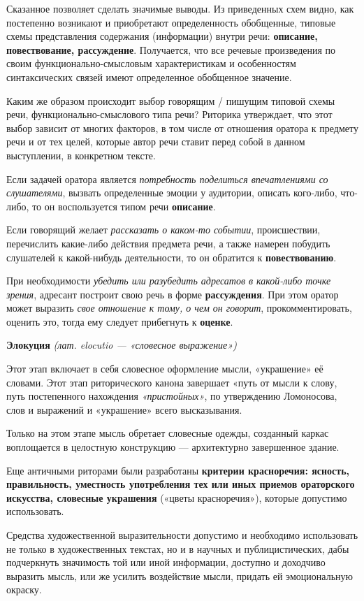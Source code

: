 Сказанное позволяет сделать значимые выводы. 
Из приведенных схем видно, как постепенно возникают и приобретают определенность обобщенные, типовые схемы представления содержания (информации) внутри речи: \textbf{описание, повествование, рассуждение}. Получается, что все речевые произведения по своим функционально-смысловым характеристикам и особенностям синтаксических связей имеют определенное обобщенное значение.

Каким же образом происходит выбор говорящим / пишущим типовой схемы речи, функционально-смыслового типа речи?  Риторика утверждает, что этот выбор зависит от многих факторов, в том числе от отношения оратора к предмету речи и от тех целей, которые автор речи ставит перед собой в данном выступлении, в конкретном тексте. 

Если задачей оратора является \textit{потребность поделиться впечатлениями со слушателями}, вызвать определенные эмоции у аудитории, описать кого-либо, что-либо, то он воспользуется типом речи \textbf{описание}. 

Если говорящий желает \textit{рассказать о каком-то событии}, происшествии, перечислить
какие-либо действия предмета речи, а также намерен побудить слушателей к какой-нибудь деятельности, то он обратится к \textbf{повествованию}. 

При необходимости \textit{убедить или разубедить адресатов в какой-либо точке зрения}, адресант построит свою речь в форме \textbf{рассуждения}. При этом оратор может выразить \textit{свое отношение к тому, о чем он говорит}, прокомментировать, оценить это, тогда ему следует прибегнуть к \textbf{оценке}.

\textbf{Элокуция} \textit{(лат. elocutio — «словесное выражение»)}

Этот этап включает в себя словесное оформление мысли, «украшение» её словами. Этот этап риторического канона завершает «путь от мысли к слову, путь постепенного нахождения \textit{«пристойных»}, по утверждению Ломоносова, слов и выражений и «украшение» всего высказывания.

Только на этом этапе мысль обретает словесные одежды, созданный каркас воплощается в целостную конструкцию — архитектурно завершенное здание.

Еще античными риторами были разработаны \textbf{критерии красноречия: ясность, правильность, уместность употребления тех или иных приемов ораторского искусства, словесные украшения} («цветы красноречия»), которые допустимо использовать.

Средства художественной выразительности допустимо и необходимо использовать не только в художественных текстах, но и в научных и публицистических, дабы подчеркнуть значимость той или иной информации, доступно и доходчиво выразить мысль, или же усилить воздействие мысли, придать ей эмоциональную окраску.

